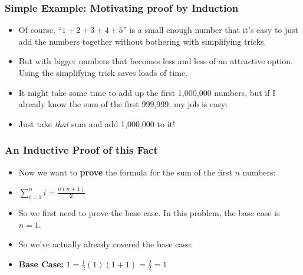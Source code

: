  \begin{frame}
\frametitle{Simple Example: Motivating proof by Induction}

\begin{itemize}[<+->]
\item Of course,  ``$1+2+3 + 4 + 5$'' is a small enough number that it's easy to just add the numbers together without bothering with simplifying tricks.

\item But with bigger numbers that becomes less and less of an attractive option. Using the simplifying trick saves loads of time.

\item It might take some time to add up the first 1,000,000 numbers, but if I already know the sum of the first 999,999, my job is easy: 

\item Just take {\it{that}} sum and add 1,000,000 to it!


\end{itemize} 
\end{frame}

 \begin{frame}
\frametitle{An Inductive Proof of this Fact}

\begin{itemize}[<+->]

\item Now we want to \textbf{prove} the formula for the sum of the first $n$ numbers:

\item $\displaystyle\sum_{i=1}^n i =\frac{n(n+1)}{2}$

\item So we first need to prove the base case. In this problem, the base case is $n=1$.

\item So we've actually already covered the base case:

\item {\bf{Base Case:}}   $1 =  \frac{1}{2} (1) (1+1) = \frac{2}{2} =1$


\end{itemize} 
\end{frame}

